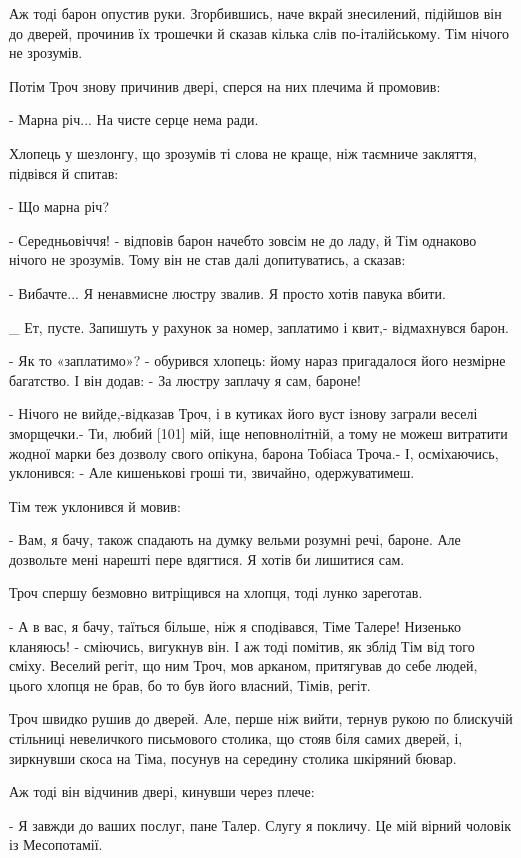 Аж тоді барон опустив руки. Згорбившись, наче вкрай знесилений, підійшов він до дверей, прочинив їх трошечки й сказав кілька слів по-італійському. Тім нічого не зрозумів.

Потім Троч знову причинив двері, сперся на них плечима й промовив:

- Марна річ... На чисте серце нема ради.

Хлопець у шезлонгу, що зрозумів ті слова не краще, ніж таємниче закляття, підвівся й спитав:

- Що марна річ?

- Середньовіччя! - відповів барон начебто зовсім не до ладу, й Тім однаково нічого не зрозумів. Тому він не став далі допитуватись, а сказав:

- Вибачте... Я ненавмисне люстру звалив. Я просто хотів павука вбити.

_ Ет, пусте. Запишуть у рахунок за номер, заплатимо і квит,- відмахнувся барон.

- Як то «заплатимо»? - обурився хлопець: йому нараз пригадалося його незмірне багатство. І він додав: - За люстру заплачу я сам, бароне!

- Нічого не вийде,-відказав Троч, і в кутиках його вуст ізнову заграли веселі зморщечки.- Ти, любий [101] мій, іще неповнолітній, а тому не можеш витратити жодної марки без дозволу свого опікуна, барона Тобіаса Троча.- І, осміхаючись, уклонився: - Але кишенькові гроші ти, звичайно, одержуватимеш.

Тім теж уклонився й мовив:

- Вам, я бачу, також спадають на думку вельми розумні речі, бароне. Але дозвольте мені нарешті пере вдягтися. Я хотів би лишитися сам.

Троч спершу безмовно витріщився на хлопця, тоді лунко зареготав.

- А в вас, я бачу, таїться більше, ніж я сподівався, Тіме Талере! Низенько кланяюсь! - сміючись, вигукнув він. І аж тоді помітив, як зблід Тім від того сміху. Веселий регіт, що ним Троч, мов арканом, притягував до себе людей, цього хлопця не брав, бо то був його власний, Тімів, регіт.

Троч швидко рушив до дверей. Але, перше ніж вийти, тернув рукою по блискучій стільниці невеличкого письмового столика, що стояв біля самих дверей, і, зиркнувши скоса на Тіма, посунув на середину столика шкіряний бювар.

Аж тоді він відчинив двері, кинувши через плече:

- Я завжди до ваших послуг, пане Талер. Слугу я покличу. Це мій вірний чоловік із Месопотамії.

